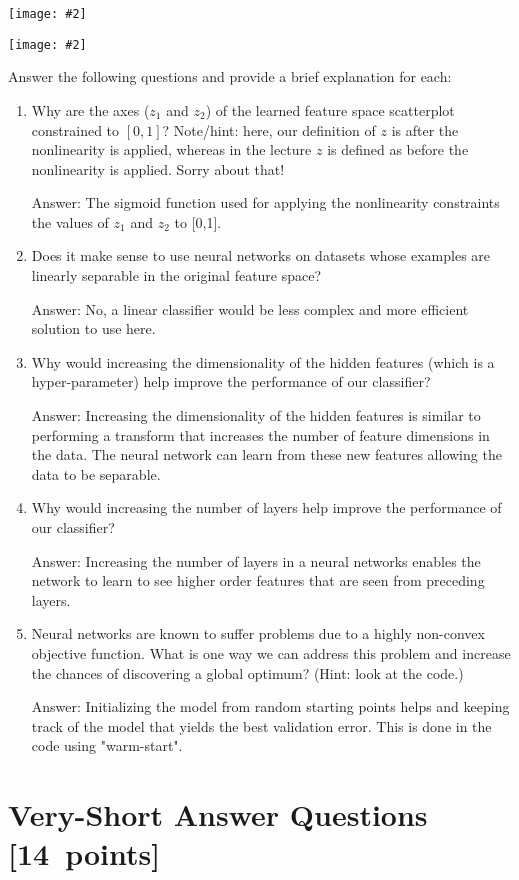 \documentclass{article}
\newcommand{\blu}[1]{{\textcolor{blu}{#1}}}
\newcommand{\gre}[1]{\textcolor{gre}{#1}}
\newcommand\ans[1]{\par\gre{Answer: #1}}
\let\ask\blu
\newcommand\pts[1]{\textcolor{pointscolour}{[#1~points]}}
\newcommand{\centerfig}[2]{\begin{center}\texttt{[image: \#2]}\end{center}}
\begin{document}
\centerfig{.7}{./figs/sinusoids_decision_boundary_[2, 2]_2.png}
\centerfig{.7}{./figs/sinusoids_linear_boundary_[2, 2]_2.png}

\ask{Answer the following questions and provide a brief explanation for each:}

\begin{enumerate}
	\item Why are the axes ($z_1$ and $z_2$) of the learned feature space scatterplot constrained to $[0, 1]$? Note/hint: here, our definition of $z$ is after the nonlinearity is applied, whereas in the lecture $z$ is defined as before the nonlinearity is applied. Sorry about that!
    \ans{The sigmoid function used for applying the nonlinearity constraints the values of $z_1$ and $z_2$ to [0,1].}
	\item Does it make sense to use neural networks on datasets whose examples are linearly separable in the original feature space?
    \ans{No, a linear classifier would be less complex and more efficient solution to use here.}
	\item Why would increasing the dimensionality of the hidden features (which is a hyper-parameter) help improve the performance of our classifier?
    \ans{Increasing the dimensionality of the hidden features is similar to performing a transform that increases the number of feature dimensions in the data. The neural network can learn from these new features allowing the data to be separable.}
	\item Why would increasing the number of layers help improve the performance of our classifier?
    \ans{Increasing the number of layers in a neural networks enables the network to learn to see higher order features that are seen from preceding layers.}
	\item Neural networks are known to suffer problems due to a highly non-convex objective function. What is one way we can address this problem and increase the chances of discovering a global optimum? (Hint: look at the code.)
    \ans{Initializing the model from random starting points helps and keeping track of the model that yields the best validation error. This is done in the code using "warm-start".}
\end{enumerate}
\newpage

\section{Very-Short Answer Questions \pts{14}}
\end{document}
